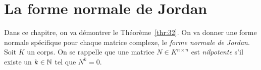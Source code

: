 
\chapter{La forme normale de Jordan}
\label{cha:la-forme-normale}




\noindent 
Dans ce chapitre, on va démontrer le Théorème~\ref{thr:32}.  On va donner une forme normale spécifique pour chaque matrice complexe, le \emph{forme normale de Jordan}.
Soit $K$ un corps. 
 On se rappelle que une  matrice $N ∈ K^{n ×n}$ est \emph{nilpotente} s'il existe un $k \in \mathbb{N}$ tel que $N^k = 0$. 





